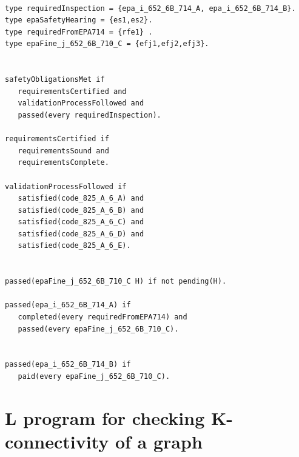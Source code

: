 \documentclass[a4paper,10pt]{article}
\providecommand{\DIFaddbegin}{} %
\providecommand{\DIFaddend}{} %
\providecommand{\DIFdelbegin}{} %
\providecommand{\DIFdelend}{} %
\begin{document}
\DIFdelend \DIFaddbegin \begin{verbatim}

type requiredInspection = {epa_i_652_6B_714_A, epa_i_652_6B_714_B}.
type epaSafetyHearing = {es1,es2}.
type requiredFromEPA714 = {rfe1} .
type epaFine_j_652_6B_710_C = {efj1,efj2,efj3}.


safetyObligationsMet if
   requirementsCertified and
   validationProcessFollowed and
   passed(every requiredInspection).

requirementsCertified if
   requirementsSound and
   requirementsComplete.

validationProcessFollowed if
   satisfied(code_825_A_6_A) and
   satisfied(code_825_A_6_B) and
   satisfied(code_825_A_6_C) and
   satisfied(code_825_A_6_D) and
   satisfied(code_825_A_6_E).


passed(epaFine_j_652_6B_710_C H) if not pending(H).

passed(epa_i_652_6B_714_A) if
   completed(every requiredFromEPA714) and
   passed(every epaFine_j_652_6B_710_C).


passed(epa_i_652_6B_714_B) if
   paid(every epaFine_j_652_6B_710_C).
\end{verbatim}
\DIFaddend \pagebreak
\section{L program for checking K-connectivity of a graph}\label{B}
\DIFdelbegin %





\end{document}
